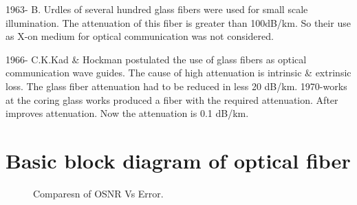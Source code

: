 \documentclass[12pt]{report}
\begin{document}
	
	1963- B. Urdles of several hundred glass fibers were used for small scale illumination. The attenuation of this fiber is greater than 100dB/km. So their use as X-on medium for optical communication was not considered. 
	
	
	1966- C.K.Kad \& Hockman postulated the use of glass fibers as optical communication wave guides. The cause of high attenuation is intrinsic \& extrinsic loss. The glass fiber attenuation had to be reduced in less 20 dB/km. 
	1970-works at the coring glass works produced a fiber with the required attenuation. After improves attenuation. Now the attenuation is 0.1 dB/km.
	\section{Basic block diagram of optical fiber}
	\begin{figure}[htbp]
		\caption{Comparesn of OSNR Vs Error.}
		\label{xyz}
	\end{figure}
	
\end{document}
